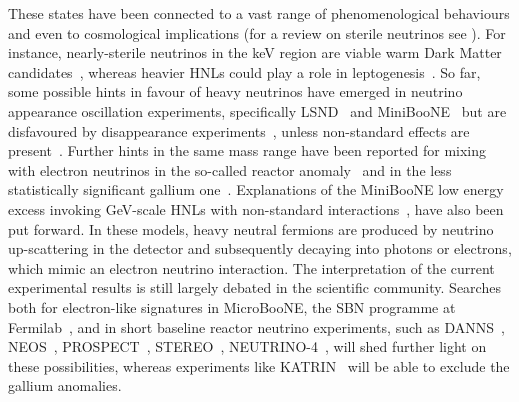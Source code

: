 These states have been connected to a vast range of phenomenological behaviours and %
even to cosmological implications (for a review on sterile neutrinos see ).
For instance, nearly-sterile neutrinos in the keV region are viable warm Dark Matter candidates~\cite{Asaka:2005an}, %
whereas heavier HNLs could play a role in leptogenesis~\cite{Fukugita:1986hr, Covi:1996wh, Pilaftsis:1997jf}.
So far, some possible hints in favour of heavy neutrinos have emerged in neutrino appearance oscillation experiments, %
specifically LSND~\cite{Aguilar:2001ty} and MiniBooNE~\cite{Aguilar-Arevalo:2012fmn, Aguilar-Arevalo:2013pmq, Aguilar-Arevalo:2018gpe} %
but are disfavoured by disappearance experiments~\cite{TheIceCube:2016oqi, Adamson:2017uda, Aartsen:2017bap}, %
unless non-standard effects are present~\cite{Liao:2016reh, Liao:2018mbg, Esmaili:2018qzu, Denton:2018dqq}.
Further hints in the same mass range have been reported for mixing with electron neutrinos in the %
so-called reactor anomaly~\cite{Mueller:2011nm, Mention:2011rk, Huber:2011wv, Ko:2016owz, Alekseev:2018efk} %
and in the less statistically significant gallium one~\cite{Abdurashitov:2005tb, Laveder:2007zz, Giunti:2006bj}.
Explanations of the MiniBooNE low energy excess invoking GeV-scale HNLs with non-standard %
interactions~\cite{Gninenko:2009ks, Gninenko:2010pr, Masip:2012ke, Bertuzzo:2018itn, Ballett:2018ynz}, %
have also been put forward.
In these models, heavy neutral fermions are produced by neutrino up-scattering in the detector %
and subsequently decaying into photons or electrons, which mimic an electron neutrino interaction.
The interpretation of the current experimental results is still largely debated in the scientific community.
Searches both for electron-like signatures in MicroBooNE, the SBN programme at Fermilab~\cite{Antonello:2015lea}, %
and in short baseline reactor neutrino experiments, such as DANNS~\cite{Alekseev:2018efk}, NEOS~\cite{Ko:2016owz}, %
PROSPECT~\cite{Ashenfelter:2018iov}, STEREO~\cite{Almazan:2018wln}, \mbox{NEUTRINO-4}~\cite{Serebrov:2018vdw}, %
will shed further light on these possibilities, %
whereas experiments like KATRIN~\cite{Mertens:2018vuu} will be able to exclude the gallium anomalies.

